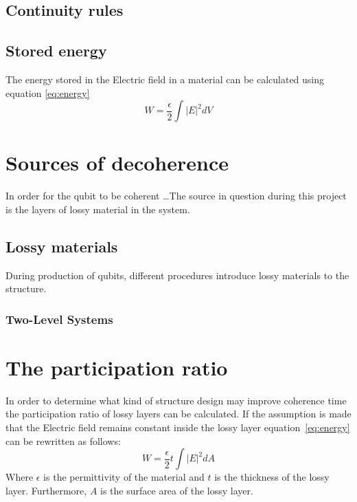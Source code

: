 \subsection{Continuity rules}
\subsection{Stored energy}
The energy stored in the Electric field in a material can be calculated using equation \eqref{eq:energy}
\begin{equation} \label{eq:energy}
	W = \frac{\epsilon}{2}\int{|E|}^{2}dV
\end{equation}

\section{Sources of decoherence}
In order for the qubit to be coherent \ldots The source in question during this project is the layers of lossy material in the system.
\subsection{Lossy materials}
During production of qubits, different procedures introduce lossy materials to the structure.  
\subsubsection{Two-Level Systems}

\section{The participation ratio}
In order to determine what kind of structure design may improve coherence time the participation ratio of lossy layers can be calculated. If the assumption is made that the Electric field remains constant inside the lossy layer equation~\eqref{eq:energy} can be rewritten as follows:
\begin{equation}\label{eq:energy_layer}
W = \frac{\epsilon}{2}t\int{|E|}^{2}dA
\end{equation}
Where \(\epsilon\) is the permittivity of the material and \(t\) is the thickness of the lossy layer. Furthermore, \(A\) is the surface area of the lossy layer.


